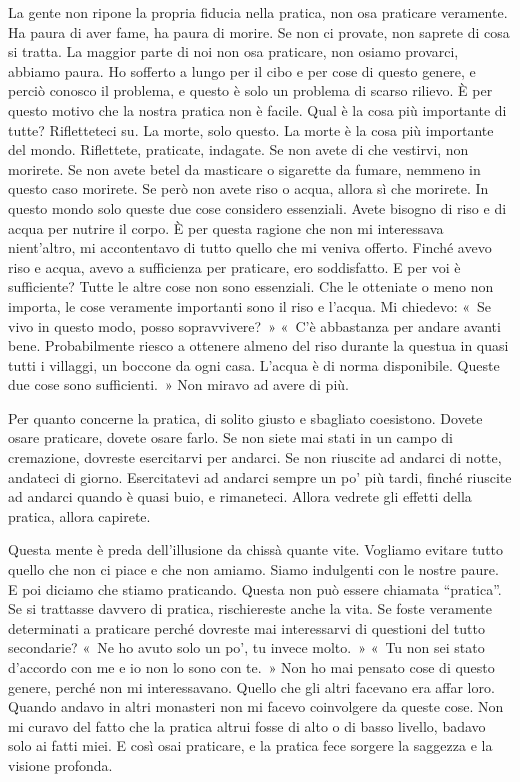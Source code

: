 La gente non ripone la propria fiducia nella pratica, non osa praticare
veramente. Ha paura di aver fame, ha paura di morire. Se non ci provate,
non saprete di cosa si tratta. La maggior parte di noi non osa
praticare, non osiamo provarci, abbiamo paura. Ho sofferto a lungo per
il cibo e per cose di questo genere, e perciò conosco il problema, e
questo è solo un problema di scarso rilievo. È per questo motivo che la
nostra pratica non è facile. Qual è la cosa più importante di tutte?
Rifletteteci su. La morte, solo questo. La morte è la cosa più
importante del mondo. Riflettete, praticate, indagate. Se non avete di
che vestirvi, non morirete. Se non avete betel da masticare o sigarette
da fumare, nemmeno in questo caso morirete. Se però non avete riso o
acqua, allora sì che morirete. In questo mondo solo queste due cose
considero essenziali. Avete bisogno di riso e di acqua per nutrire il
corpo. È per questa ragione che non mi interessava nient'altro, mi
accontentavo di tutto quello che mi veniva offerto. Finché avevo riso e
acqua, avevo a sufficienza per praticare, ero soddisfatto. E per voi è
sufficiente? Tutte le altre cose non sono essenziali. Che le otteniate o
meno non importa, le cose veramente importanti sono il riso e l'acqua.
Mi chiedevo: «~Se vivo in questo modo, posso sopravvivere?~» «~C'è
abbastanza per andare avanti bene. Probabilmente riesco a ottenere
almeno del riso durante la questua in quasi tutti i villaggi, un boccone
da ogni casa. L'acqua è di norma disponibile. Queste due cose sono
sufficienti.~» Non miravo ad avere di più.

Per quanto concerne la pratica, di solito giusto e sbagliato coesistono.
Dovete osare praticare, dovete osare farlo. Se non siete mai stati in un
campo di cremazione, dovreste esercitarvi per andarci. Se non riuscite
ad andarci di notte, andateci di giorno. Esercitatevi ad andarci sempre
un po' più tardi, finché riuscite ad andarci quando è quasi buio, e
rimaneteci. Allora vedrete gli effetti della pratica, allora capirete.

Questa mente è preda dell'illusione da chissà quante vite. Vogliamo
evitare tutto quello che non ci piace e che non amiamo. Siamo indulgenti
con le nostre paure. E poi diciamo che stiamo praticando. Questa non può
essere chiamata ``pratica''. Se si trattasse davvero di pratica,
rischiereste anche la vita. Se foste veramente determinati a praticare
perché dovreste mai interessarvi di questioni del tutto secondarie? «~Ne
ho avuto solo un po', tu invece molto.~» «~Tu non sei stato d'accordo
con me e io non lo sono con te.~» Non ho mai pensato cose di questo
genere, perché non mi interessavano. Quello che gli altri facevano era
affar loro. Quando andavo in altri monasteri non mi facevo coinvolgere
da queste cose. Non mi curavo del fatto che la pratica altrui fosse di
alto o di basso livello, badavo solo ai fatti miei. E così osai
praticare, e la pratica fece sorgere la saggezza e la visione profonda.

